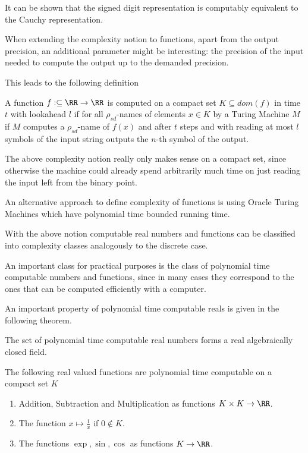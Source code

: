		It can be shown that the signed digit representation is computably equivalent to the Cauchy representation.

		When extending the complexity notion to functions, apart from the output
    precision, an additional parameter might be interesting: the precision of the input
		needed to compute the output up to the demanded precision.

    This leads to the following definition
		\begin{definition}
      A function $f: \subseteq \RR \to \RR$ is computed on a compact set $K
      \subseteq dom(f)$ in time $t$ with lookahead $l$ if for all
      $\rho_{sd}$-names of elements $ x \in K$ by a Turing Machine $M$ if $M$
      computes a $\rho_{sd}$-name of $f(x)$ and after $t$ steps and with reading
      at most $l$ symbols of the input string outputs the $n$-th symbol of the
      output.   
    \end{definition} 
    The above complexity notion really only makes sense on a compact set, since
    otherwise the machine could already spend arbitrarily much time on just
    reading the input left from the binary point.
    
    An alternative approach to define complexity of functions is using Oracle
    Turing Machines which have polynomial time bounded running time. 

    With the above notion computable real numbers and functions can be
    classified into complexity classes analogously to the discrete case.

    An important class for practical purposes is the class of polynomial time
    computable numbers and functions, since in many cases they correspond to
    the ones that can be computed efficiently with a computer.
   
    An important property of polynomial time computable reals is given in the
    following theorem.
		\begin{theorem}
			The set of polynomial time computable real numbers forms a real algebraically closed field.
		\end{theorem}
		\begin{example}
     The following real valued functions are polynomial time computable on a compact set
     $K$
     \begin{enumerate}
       \item Addition, Subtraction and Multiplication as functions $K \times K
         \to \RR$.
        \item The function $x \mapsto \frac{1}{x}$ if $0 \not \in K$. 
         \item The functions $\exp, \sin, \cos$ as functions $K \to \RR$.
     \end{enumerate}
		\end{example}

